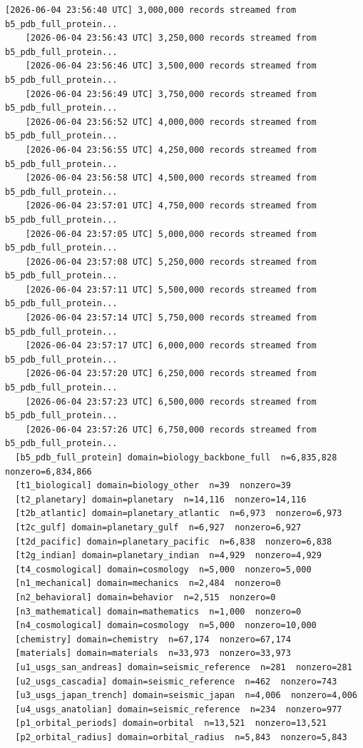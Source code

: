 \documentclass[11pt, letterpaper, openany]{book}
\begin{document}
\begin{empiricalbox}
\begin{lstlisting}[style=terminal]
    [2026-06-04 23:56:40 UTC] 3,000,000 records streamed from b5_pdb_full_protein...
    [2026-06-04 23:56:43 UTC] 3,250,000 records streamed from b5_pdb_full_protein...
    [2026-06-04 23:56:46 UTC] 3,500,000 records streamed from b5_pdb_full_protein...
    [2026-06-04 23:56:49 UTC] 3,750,000 records streamed from b5_pdb_full_protein...
    [2026-06-04 23:56:52 UTC] 4,000,000 records streamed from b5_pdb_full_protein...
    [2026-06-04 23:56:55 UTC] 4,250,000 records streamed from b5_pdb_full_protein...
    [2026-06-04 23:56:58 UTC] 4,500,000 records streamed from b5_pdb_full_protein...
    [2026-06-04 23:57:01 UTC] 4,750,000 records streamed from b5_pdb_full_protein...
    [2026-06-04 23:57:05 UTC] 5,000,000 records streamed from b5_pdb_full_protein...
    [2026-06-04 23:57:08 UTC] 5,250,000 records streamed from b5_pdb_full_protein...
    [2026-06-04 23:57:11 UTC] 5,500,000 records streamed from b5_pdb_full_protein...
    [2026-06-04 23:57:14 UTC] 5,750,000 records streamed from b5_pdb_full_protein...
    [2026-06-04 23:57:17 UTC] 6,000,000 records streamed from b5_pdb_full_protein...
    [2026-06-04 23:57:20 UTC] 6,250,000 records streamed from b5_pdb_full_protein...
    [2026-06-04 23:57:23 UTC] 6,500,000 records streamed from b5_pdb_full_protein...
    [2026-06-04 23:57:26 UTC] 6,750,000 records streamed from b5_pdb_full_protein...
  [b5_pdb_full_protein] domain=biology_backbone_full  n=6,835,828  nonzero=6,834,866
  [t1_biological] domain=biology_other  n=39  nonzero=39
  [t2_planetary] domain=planetary  n=14,116  nonzero=14,116
  [t2b_atlantic] domain=planetary_atlantic  n=6,973  nonzero=6,973
  [t2c_gulf] domain=planetary_gulf  n=6,927  nonzero=6,927
  [t2d_pacific] domain=planetary_pacific  n=6,838  nonzero=6,838
  [t2g_indian] domain=planetary_indian  n=4,929  nonzero=4,929
  [t4_cosmological] domain=cosmology  n=5,000  nonzero=5,000
  [n1_mechanical] domain=mechanics  n=2,484  nonzero=0
  [n2_behavioral] domain=behavior  n=2,515  nonzero=0
  [n3_mathematical] domain=mathematics  n=1,000  nonzero=0
  [n4_cosmological] domain=cosmology  n=5,000  nonzero=10,000
  [chemistry] domain=chemistry  n=67,174  nonzero=67,174
  [materials] domain=materials  n=33,973  nonzero=33,973
  [u1_usgs_san_andreas] domain=seismic_reference  n=281  nonzero=281
  [u2_usgs_cascadia] domain=seismic_reference  n=462  nonzero=743
  [u3_usgs_japan_trench] domain=seismic_japan  n=4,006  nonzero=4,006
  [u4_usgs_anatolian] domain=seismic_reference  n=234  nonzero=977
  [p1_orbital_periods] domain=orbital  n=13,521  nonzero=13,521
  [p2_orbital_radius] domain=orbital_radius  n=5,843  nonzero=5,843

\end{lstlisting}
\end{empiricalbox}
\end{document}
